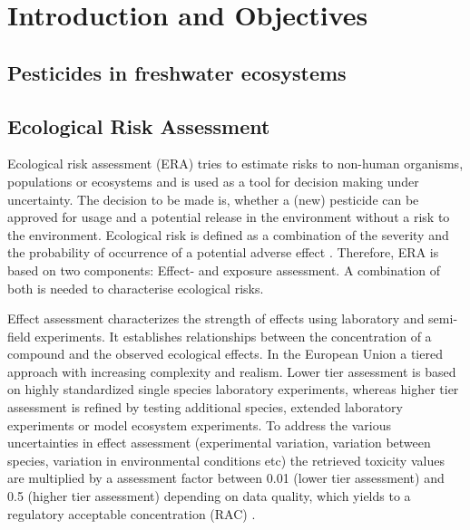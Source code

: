 \chapter{Introduction and Objectives}
\label{sec:introduction} 

\section{Pesticides in freshwater ecosystems}



\section{Ecological Risk Assessment}
Ecological risk assessment (ERA) tries to estimate risks to non-human organisms, populations or ecosystems and is used as a tool for decision making under uncertainty. 
The decision to be made is, whether a (new) pesticide can be approved for usage and a potential release in the environment without a risk to the environment. 
Ecological risk is defined as a combination of the severity and the probability of occurrence of a potential adverse effect \citep{suter_ecological_2007}. 
Therefore, ERA is based on two components: Effect- and exposure assessment.
A combination of both is needed to characterise ecological risks.

Effect assessment characterizes the strength of effects using laboratory and semi-field experiments.
It establishes relationships between the concentration of a compound and the observed ecological effects.
In the European Union a tiered approach with increasing complexity and realism.
Lower tier assessment is based on highly standardized single species laboratory experiments, whereas higher tier assessment is refined by testing additional species, extended laboratory experiments or model ecosystem experiments. 
To address the various uncertainties in effect assessment (experimental variation, variation between species, variation in environmental conditions etc) the retrieved toxicity values are multiplied by a assessment factor between 0.01 (lower tier assessment) and 0.5 (higher tier assessment) depending on data quality, which yields to a regulatory acceptable concentration (RAC) \citep{efsa_guidance_2013}. 

